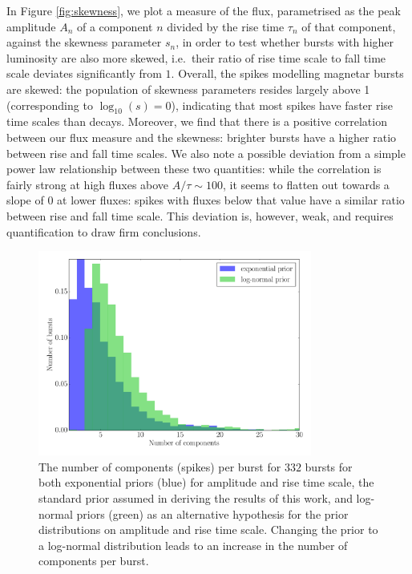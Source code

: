 \documentclass[12pt]{emulateapj}
\begin{document}
In Figure \ref{fig:skewness}, we plot a measure of the flux, parametrised as the peak amplitude $A_n$ of a component $n$ divided by the rise time $\tau_n$ of that component,
against the skewness parameter $s_n$, in order to test whether bursts with higher luminosity are also more skewed, i.e.\ their ratio of rise time scale to fall time scale deviates significantly
from $1$. Overall, the spikes modelling magnetar bursts are skewed: the population of skewness parameters resides largely above 1 (corresponding to $\log_{10}{(s)} = 0$), indicating that most
spikes have faster rise time scales than decays. Moreover, we find that there is a positive correlation between  our flux measure and the skewness: brighter bursts have a higher
ratio between rise and fall time scales. We also note a possible deviation from a simple power law relationship between these two quantities: while the correlation is fairly strong at high fluxes
above $A/\tau \sim\! 100$, it seems to flatten out towards a slope of $0$ at lower fluxes: spikes with fluxes below that value have a similar ratio between rise and fall time scale. This 
deviation is, however, weak, and requires quantification to draw firm conclusions.



 \begin{figure}[htbp]
\begin{center}
\includegraphics[width=9cm]{ch6f9.pdf}%
\caption{The number of  components (spikes) per burst for $332$ bursts for both exponential priors (blue) for amplitude and rise time scale, the standard prior assumed in
deriving the results of this work, and log-normal priors (green) as an alternative hypothesis for the prior distributions on amplitude and rise time scale. Changing the prior to a log-normal
distribution leads to an increase in the number of components per burst.}
\label{fig:nspikes_prior}
\end{center}
\end{figure}
\end{document}
